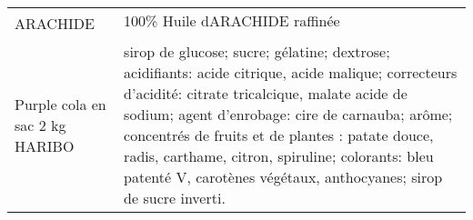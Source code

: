 \begin{longtable}{p{5cm}p{10cm}}
                                                                                                 ARACHIDE &                                                                                                                                                                                                                                                                                                                                                                                                                                                                                                                                                                                                                                                                                                                                                                                                                                                                                                                                                                                                           100\% Huile dARACHIDE raffinée \\
                                                                           Purple cola en sac 2 kg HARIBO &                                                                                                                                                                                                                                                                                                                                                                                                                                                                                                                                                                                                                                                       sirop de glucose; sucre; gélatine; dextrose; acidifiants: acide citrique, acide malique; correcteurs d'acidité: citrate tricalcique, malate acide de sodium; agent d'enrobage: cire de carnauba; arôme; concentrés de fruits et de plantes : patate douce, radis, carthame, citron, spiruline; colorants: bleu patenté V, carotènes végétaux, anthocyanes; sirop de sucre inverti. \\

\end{longtable}

